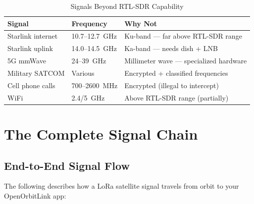 \documentclass[12pt,a4paper]{article}
\begin{document}
\begin{table}[h!]
\centering
\caption{Signals Beyond RTL-SDR Capability}
\begin{tabular}{@{}llp{5cm}@{}}
\toprule
\textbf{Signal} & \textbf{Frequency} & \textbf{Why Not} \\
\midrule
Starlink internet & 10.7--12.7~GHz & Ku-band — far above RTL-SDR range \\
Starlink uplink & 14.0--14.5~GHz & Ka-band — needs dish + LNB \\
5G mmWave & 24--39~GHz & Millimeter wave — specialized hardware \\
Military SATCOM & Various & Encrypted + classified frequencies \\
Cell phone calls & 700--2600~MHz & Encrypted (illegal to intercept) \\
WiFi & 2.4/5~GHz & Above RTL-SDR range (partially) \\
\bottomrule
\end{tabular}
\end{table}

\section{The Complete Signal Chain}

\subsection{End-to-End Signal Flow}

The following describes how a LoRa satellite signal travels from orbit to your 
OpenOrbitLink app:
\end{document}
